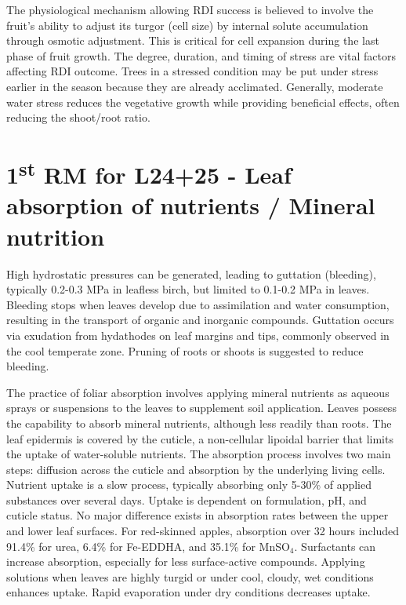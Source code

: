 \vspace{0.5em}
The physiological mechanism allowing RDI success is believed to involve the fruit's ability to adjust its turgor (cell size) by internal solute accumulation through osmotic adjustment. This is critical for cell expansion during the last phase of fruit growth. The degree, duration, and timing of stress are vital factors affecting RDI outcome. Trees in a stressed condition may be put under stress earlier in the season because they are already acclimated. Generally, moderate water stress reduces the vegetative growth while providing beneficial effects, often reducing the shoot/root ratio.


\section{\texorpdfstring{1\textsuperscript{st} RM for L24+25 - Leaf absorption of nutrients / Mineral nutrition}{1st RM for L24+25 - Leaf absorption of nutrients / Mineral nutrition}}

High hydrostatic pressures can be generated, leading to guttation (bleeding), typically 0.2-0.3 MPa in leafless birch, but limited to 0.1-0.2 MPa in leaves. Bleeding stops when leaves develop due to assimilation and water consumption, resulting in the transport of organic and inorganic compounds. Guttation occurs via exudation from hydathodes on leaf margins and tips, commonly observed in the cool temperate zone. Pruning of roots or shoots is suggested to reduce bleeding.

\vspace{0.5em}
The practice of foliar absorption involves applying mineral nutrients as aqueous sprays or suspensions to the leaves to supplement soil application. Leaves possess the capability to absorb mineral nutrients, although less readily than roots. The leaf epidermis is covered by the cuticle, a non-cellular lipoidal barrier that limits the uptake of water-soluble nutrients. The absorption process involves two main steps: diffusion across the cuticle and absorption by the underlying living cells. Nutrient uptake is a slow process, typically absorbing only 5-30\% of applied substances over several days. Uptake is dependent on formulation, pH, and cuticle status. No major difference exists in absorption rates between the upper and lower leaf surfaces. For red-skinned apples, absorption over 32 hours included 91.4\% for urea, 6.4\% for Fe-EDDHA, and 35.1\% for MnSO$_4$. Surfactants can increase absorption, especially for less surface-active compounds. Applying solutions when leaves are highly turgid or under cool, cloudy, wet conditions enhances uptake. Rapid evaporation under dry conditions decreases uptake.


